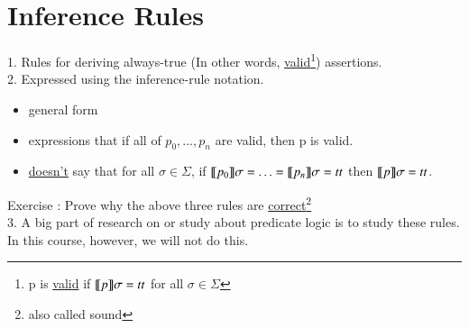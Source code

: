 \documentclass{report}[12pt]
\begin{document}
\section{Inference Rules}
1. Rules for deriving always-true (In other words, \underline{valid}\footnote{p is \underline{valid} if $\llbracket  p  \rrbracket \sigma = tt$ for all $\sigma \in \Sigma$}) assertions. \\
2. Expressed using the inference-rule notation. \\
\begin{itemize}
    \item general form
    \item expressions that if all of $p_0, \ldots, p_n$ are valid, then p is valid.
    \item \underline{doesn't} say that for all $\sigma \in \Sigma$, if $\llbracket  p_0  \rrbracket \sigma = \ldots = \llbracket  p_n  \rrbracket \sigma = tt$ then $\llbracket  p  \rrbracket \sigma = tt$.
\end{itemize}
Exercise : Prove why the above three rules are \underline{correct}\footnote{also called sound} \\
3. A big part of research on or study about predicate logic is to study these rules. \\
In this course, however, we will not do this.
\end{document}
